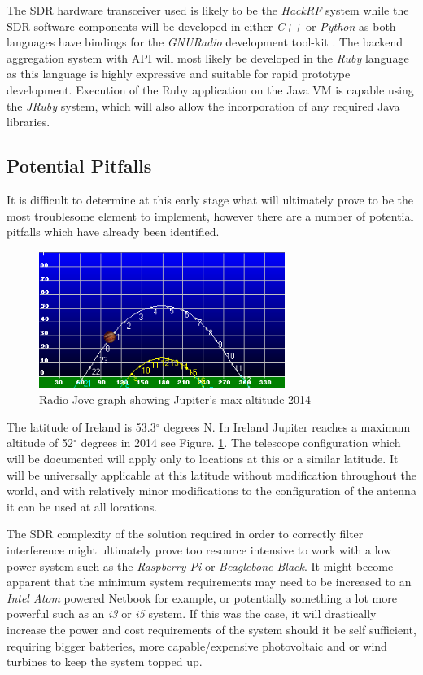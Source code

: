 \documentclass[runningheads,a4paper]{llncs}
\begin{document}
The \gls{SDR} hardware transceiver used is likely to be the \textit{HackRF} system while the \gls{SDR} software components will be developed in either \textit{C++} or \textit{Python} as both languages have bindings for the \textit{GNURadio} development tool-kit \citep{gnuradio-14}. The backend aggregation system with API will most likely be developed in the \textit{Ruby} language as this language is highly expressive and suitable for rapid prototype development. Execution of the Ruby application on the Java VM is capable using the \textit{JRuby} system, which will also allow the incorporation of any required Java libraries.


\subsection*{Potential Pitfalls}

It is difficult to determine at this early stage what will ultimately prove to be the most troublesome element to implement, however there are a number of potential pitfalls which have already been identified.

%
\begin{figure}[here]
\centering
\includegraphics[width=8cm]{images/11}
\caption{Radio Jove graph showing Jupiter's max altitude 2014 \citep{rjp-14}}
\label{fig:jupiter_max_altitude_2014}
\end{figure}
%

The latitude of Ireland is 53.3$^{\circ}$ degrees N. In Ireland Jupiter reaches a maximum altitude of 52$^{\circ}$ degrees in 2014 see Figure. \ref{fig:jupiter_max_altitude_2014}. The telescope configuration which will be documented will apply only to locations at this or a similar latitude. It will be universally applicable at this latitude without modification throughout the world, and with relatively minor modifications to the configuration of the antenna it can be used at all locations. \cite{nasa12}

The \gls{SDR} complexity of the solution required in order to correctly filter interference might ultimately prove too resource intensive to work with a low power system such as the \textit{Raspberry Pi} or \textit{Beaglebone Black}. It might become apparent that the minimum system requirements may need to be increased to an \textit{Intel Atom} powered Netbook for example, or potentially something a lot more powerful such as an \textit{i3} or \textit{i5} system. If this was the case, it will drastically increase the power and cost requirements of the system should it be self sufficient, requiring bigger batteries, more capable/expensive photovoltaic and or wind turbines to keep the system topped up.
\end{document}
